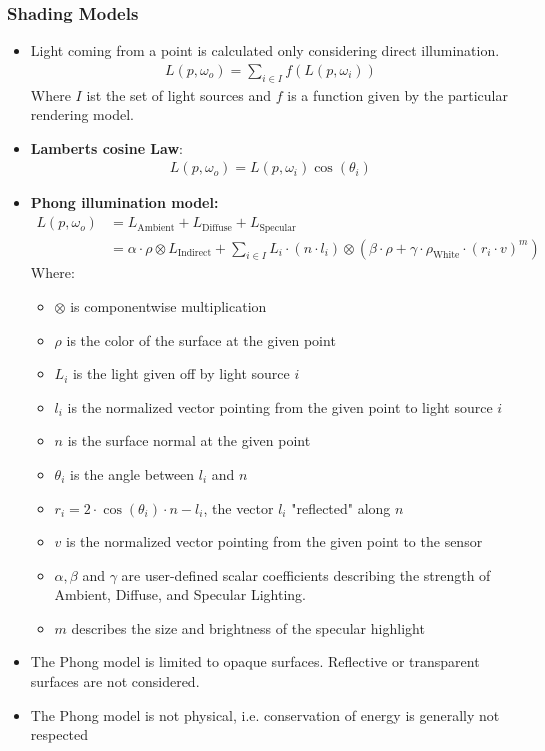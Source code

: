 \documentclass{scrartcl}
\begin{document}
\subsubsection*{Shading Models}
\begin{itemize}
    \item Light coming from a point is calculated only considering direct illumination.
    \begin{align*}
        L(p,\omega_o) = \sum_{i \in I} f(L(p,\omega_i))   
    \end{align*}
    Where $I$ ist the set of light sources and $f$ is a function given by the particular rendering model.
    \item \textbf{Lamberts cosine Law}:
    \begin{align*}
        L(p,\omega_o) = L(p, \omega_i)\cos(\theta_i)
    \end{align*}
    \item \textbf{Phong illumination model:}
    \begin{align*}
        L(p,\omega_o) &= L_\text{Ambient} + L_\text{Diffuse} + L_\text{Specular}\\
        &= \alpha \cdot \rho \otimes L_\text{Indirect} + \sum_{i \in I} L_i \cdot (n \cdot l_i) \otimes (\beta \cdot \rho + \gamma \cdot \rho_{\text{White}} \cdot (r_i \cdot v)^m)
    \end{align*}
    Where:
    \begin{itemize}
        \item $\otimes$ is componentwise multiplication
        \item $\rho$ is the color of the surface at the given point
        \item $L_i$ is the light given off by light source $i$
        \item $l_i$ is the normalized vector pointing from the given point to light source $i$
        \item $n$ is the surface normal at the given point
        \item $\theta_i$ is the angle between $l_i$ and $n$
        \item $r_i = 2 \cdot \cos(\theta_i) \cdot n - l_i$, the vector $l_i$ "reflected" along $n$
        \item $v$ is the normalized vector pointing from the given point to the sensor
        \item $\alpha, \beta$ and $\gamma$ are user-defined scalar coefficients describing the strength of Ambient, Diffuse, and Specular Lighting.
        \item $m$ describes the size and brightness of the specular highlight
    \end{itemize}
    \item The Phong model is limited to opaque surfaces. Reflective or transparent surfaces are not considered.
    \item The Phong model is not physical, i.e. conservation of energy is generally not respected
\end{itemize}
\end{document}
